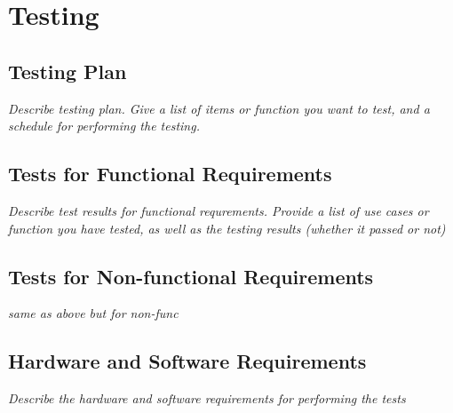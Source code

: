 
\section{Testing}\label{sec:testing}
    \subsection{Testing Plan}
        \emph{Describe testing plan. Give a list of items or function you want to test, and a schedule for performing the testing.}

    \subsection{Tests for Functional Requirements}
        \emph{Describe test results for functional requrements. Provide a list of use cases or function you have tested, as well as the testing results (whether it passed or not)}

    \subsection{Tests for Non-functional Requirements}
        \emph{same as above but for non-func}
    
    \subsection{Hardware and Software Requirements}
        \emph{Describe the hardware and software requirements for performing the tests}
